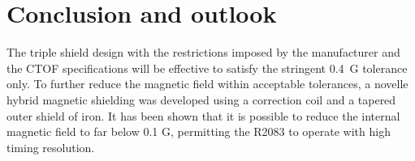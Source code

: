 \documentclass[12pt]{article}
\begin{document}






\section{Conclusion and outlook}




The triple shield design with the restrictions imposed by the
 manufacturer and the CTOF  specifications will  be effective  to 
satisfy the stringent 0.4~G tolerance only.
To further reduce the magnetic field within acceptable tolerances, a novelle 
hybrid magnetic shielding was developed
using a correction coil and a tapered outer shield of iron. 
 It has been shown that it is possible to reduce the internal magnetic field to far  below 0.1 G, permitting the
 R2083 to operate with high timing resolution.
\end{document}
